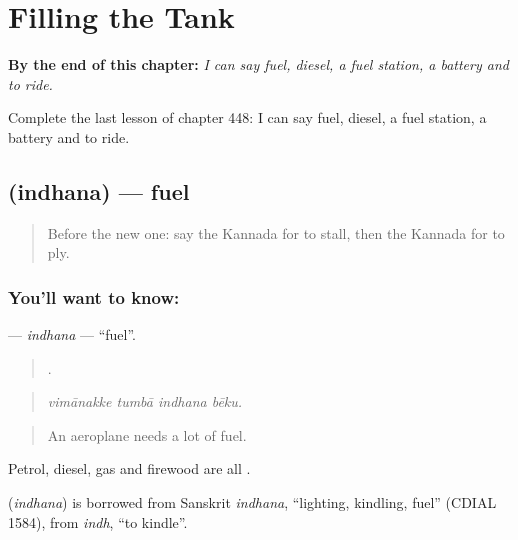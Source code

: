 
\chapter{Filling the Tank}
\label{ch:ka-filling-the-tank}

\begin{chapteropening}
\textbf{By the end of this chapter:} \emph{I can say fuel, diesel, a fuel station, a battery and to ride.}

Complete the last lesson of chapter 448: I can say fuel, diesel, a fuel station, a battery and to ride.
\end{chapteropening}

\section[\texorpdfstring{\kn{ಇಂಧನ} (indhana)}{ಇಂಧನ (indhana)}]{ (indhana) — fuel}

\label{lesson:KA-C448-indhana}



\begin{quote}
Before the new one: say the Kannada for to stall, then the Kannada for to ply.
\end{quote}

\subsection*{You'll want to know: }
\textbf{} — \emph{indhana} — \textquotedblleft{}fuel\textquotedblright{}.

\begin{quote}
   .
\end{quote}

\begin{quote}
\emph{vimānakke tumbā indhana bēku.}
\end{quote}

\begin{quote}
An aeroplane needs a lot of fuel.
\end{quote}

Petrol, diesel, gas and firewood are all .

\begin{cousinweb}
\textbf{} (\emph{indhana}) is borrowed from Sanskrit \emph{indhana}, \textquotedblleft{}lighting, kindling, fuel\textquotedblright{} (CDIAL 1584), from \emph{indh}, \textquotedblleft{}to kindle\textquotedblright{}.
\end{cousinweb}

